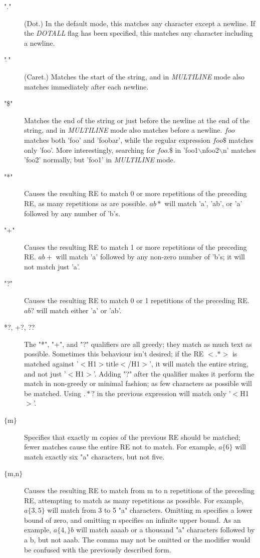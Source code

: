 \begin{description}
    \item ["."]
    (Dot.) In the default mode, this matches any character except a newline. If the \emph{DOTALL} flag has been specified, this matches any character including a newline.
    \item ["$\hat{~}$"]
    (Caret.) Matches the start of the string, and in \emph{MULTILINE} mode also matches immediately after each newline.
    \item ["\$"]
    Matches the end of the string or just before the newline at the end of the string, and in \emph{MULTILINE} mode also matches before a newline. $foo$ matches both 'foo' and 'foobar', while the regular expression $foo\$$ matches only 'foo'. More interestingly, searching for $foo.\$$ in 'foo1$\backslash$nfoo2$\backslash$n' matches 'foo2' normally, but 'foo1' in \emph{MULTILINE} mode.
    \item ["*"]
    Causes the resulting RE to match 0 or more repetitions of the preceding RE, as many repetitions as are possible. $ab*$ will match 'a', 'ab', or 'a' followed by any number of 'b's.
    \item ["+"]
    Causes the resulting RE to match 1 or more repetitions of the preceding RE. $ab+$ will match 'a' followed by any non-zero number of 'b's; it will not match just 'a'.
    \item ["?"]
    Causes the resulting RE to match 0 or 1 repetitions of the preceding RE. $ab?$ will match either 'a' or 'ab'.
    \item [*?, +?, ??]
    The "*", "+", and "?" qualifiers are all greedy; they match as much text as possible. Sometimes this behaviour isn't desired; if the RE $<.*>$ is matched against '$<$H1$>$title$<$/H1$>$', it will match the entire string, and not just '$<$H1$>$'. Adding "?" after the qualifier makes it perform the match in non-greedy or minimal fashion; as few characters as possible will be matched. Using $.*?$ in the previous expression will match only '$<$H1$>$'.
    \item [$\{$m$\}$]
    Specifies that exactly m copies of the previous RE should be matched; fewer matches cause the entire RE not to match. For example, $a\{6\}$ will match exactly six "a" characters, but not five.
    \item [$\{$m,n$\}$]
    Causes the resulting RE to match from m to n repetitions of the preceding RE, attempting to match as many repetitions as possible. For example, $a\{3,5\}$ will match from 3 to 5 "a" characters. Omitting m specifies a lower bound of zero, and omitting n specifies an infinite upper bound. As an example, $a\{4,\}b$ will match aaaab or a thousand "a" characters followed by a b, but not aaab. The comma may not be omitted or the modifier would be confused with the previously described form.

\end{description}
